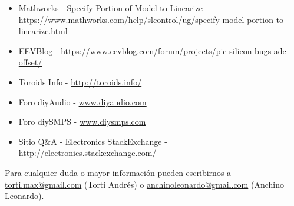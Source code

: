 \documentclass[12pt]{report}
\begin{document}
\begin{itemize}
	\item Mathworks - Specify Portion of Model to Linearize - \url{https://www.mathworks.com/help/slcontrol/ug/specify-model-portion-to-linearize.html}
	\item EEVBlog - \url{https://www.eevblog.com/forum/projects/pic-silicon-bugs-adc-offset/}
	\item Toroids Info - \url{http://toroids.info/}
	\item Foro diyAudio - \url{www.diyaudio.com}
	\item Foro diySMPS - \url{www.diysmps.com}
	\item Sitio Q\&A - Electronics StackExchange - \url{http://electronics.stackexchange.com/}
\end{itemize}

Para cualquier duda o mayor información pueden escribirnos a \href{mailto:torti.max@gmail.com}{torti.max@gmail.com} (Torti Andrés) o \href{mailto:anchinoleonardo@gmail.com}{anchinoleonardo@gmail.com} (Anchino Leonardo).
\end{document}
